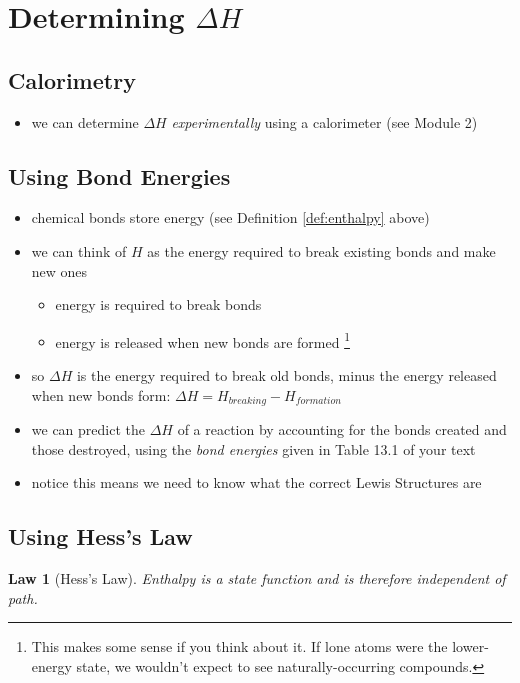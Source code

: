 \documentclass[11pt, oneside]{article}   	%
\newtheorem{law}{Law}
\begin{document}
\section{Determining $\Delta H$}
\subsection{Calorimetry}
\begin{itemize}
\item we can determine $\Delta H$ \emph{experimentally} using a calorimeter (see Module 2)
\end{itemize}

\subsection{Using Bond Energies}
\begin{itemize}
\item chemical bonds store energy (see Definition \ref{def:enthalpy} above)
\item we can think of $H$ as the energy required to break existing bonds and make new ones
\begin{itemize}
\item energy is required to break bonds
\item energy is released when new bonds are formed
\footnote{This makes some sense if you think about it. If lone atoms were the lower-energy state, we wouldn't expect to see naturally-occurring compounds.}
\end{itemize}
\item so $\Delta H $ is the energy required to break old bonds, minus the energy released when new bonds form: $\Delta H = H_{breaking} - H_{formation}$
\item we can predict the $\Delta H$ of a reaction by accounting for the bonds created and those destroyed, using the \emph{bond energies} given in Table 13.1 of your text \cite[p. 424]{wile-chem-2}
\item notice this means we need to know what the correct Lewis Structures are
\end{itemize}

\subsection{Using Hess's Law}

\begin{law}[Hess's Law]\label{def:law-hess}
Enthalpy is a state function and is therefore independent of path.
\end{law}
\end{document}
